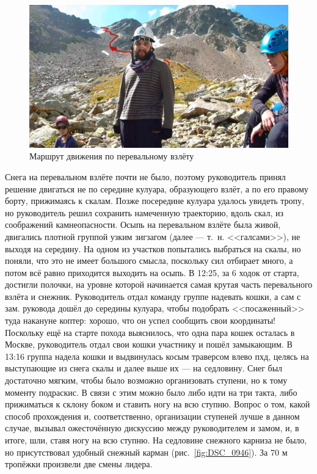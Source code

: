 \begin{figure}[h!]
	\centering
	\includegraphics[width=0.7\linewidth]{../pics/20aug2.jpg}
	\caption{Маршрут движения по перевальному взлёту}
	\label{fig:20aug2.jpg}
\end{figure}

Снега на перевальном взлёте почти не было, поэтому руководитель принял решение двигаться не по середине кулуара, образующего взлёт, а по его правому борту, прижимаясь к скалам. Позже посередине кулуара удалось увидеть тропу, но руководитель решил сохранить намеченную траекторию, вдоль скал, из соображений камнеопасности. Осыпь на перевальном взлёте была живой, двигались плотной группой узким зигзагом (далее --- т.~н. <<галсами>>), не выходя на середину. На одном из участков попытались выбраться на скалы, но поняли, что это не имеет большого смысла, поскольку сил отбирает много, а потом всё равно приходится выходить на осыпь. В 12:25, за 6 ходок от старта, достигли полочки, на уровне которой начинается самая крутая часть перевального взлёта и снежник. Руководитель отдал команду группе надевать кошки, а сам с зам. руковода дошёл до середины кулуара, чтобы подобрать <<посаженный>> туда накануне коптер: хорошо, что он успел сообщить свои координаты! Поскольку ещё на старте похода выяснилось, что одна пара кошек осталась в Москве, руководитель отдал свои кошки участнику и пошёл замыкающим. В 13:16 группа надела кошки и выдвинулась косым траверсом влево пхд, целясь на выступающие из снега скалы и далее выше их --- на седловину. Снег был достаточно мягким, чтобы было возможно организовать ступени, но к тому моменту подраскис. В связи с этим можно было либо идти на три такта, либо прижиматься к склону боком и ставить ногу на всю ступню. Вопрос о том, какой способ прохождения и, соответственно, организации ступеней лучше в данном случае, вызывал ожесточённую дискуссию между руководителем и замом, и, в итоге, шли, ставя ногу на всю ступню. На седловине снежного карниза не было, но присутствовал удобный снежный карман (рис.~\ref{fig:DSC_0946}). За 70 м тропёжки произвели две смены лидера.


